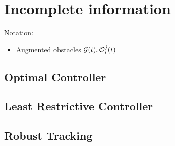 \section{Incomplete information \label{sec:incomp}}
Notation:
\begin{itemize}
\item Augmented obstacles $\bar{\mathcal{G}}(t), \bar{\mathcal{O}}_i^j(t)$
\end{itemize}

\subsection{Optimal Controller}
\subsection{Least Restrictive Controller}
\subsection{Robust Tracking}